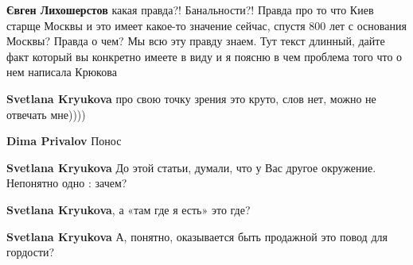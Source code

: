 \begin{itemize}
\begin{itemize}
\textbf{Євген Лихошерстов} какая правда?! Банальности?! Правда про то что Киев старще Москвы и это имеет какое-то значение сейчас, спустя 800 лет с основания Москвы? Правда о чем?
Мы всю эту правду знаем. Тут текст длинный, дайте факт который вы конкретно имеете в виду и я поясню в чем проблема того что о нем написала Крюкова

 
\textbf{Svetlana Kryukova} про свою точку зрения это круто, слов нет, можно не отвечать мне))))

 
\textbf{Dima Privalov} Понос

 
\textbf{Svetlana Kryukova} До этой статьи, думали, что у Вас другое окружение. Непонятно одно : зачем?

 
\textbf{Svetlana Kryukova}, а «там где я есть» это где?

 
\textbf{Svetlana Kryukova} А, понятно, оказывается быть продажной это повод для гордости?

\end{itemize}

 

\end{itemize}
